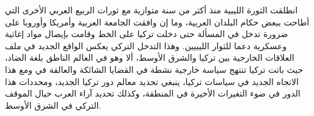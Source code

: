 \documentclass{article}
\begin{document}
\beginnumbering
\pstart[\setRL\arabicfont] %
انطلقت الثورة الليبية منذ أكثر من سنة
متوازية مع ثورات الربيع العربي الأخرى التي أطاحت ببعض حكام البلدان
العربية، وما إن وافقت الجامعة العربية وأمريكا وأوروبا على ضرورة تدخل
في المسألة حتى دخلت تركيا على الخط وقامت بإيصال مواد إغاثية وعسكرية
دعما للثوار الليبيين. وهذا التدخل التركي يعكس الواقع الجديد في ملف
العلاقات الخارجية بين تركيا والشرق الأوسط، ألا وهو  في العالم الناطق بلغة الضاد، حيث باتت تركيا تنتهج سياسة خارجية نشطة في القضايا الشائكة والعالقة في  ومع هذا الاتجاه الجديد في
سياسات تركيا، ينبغي تحديد معالم دور تركيا الجديد، ومحددات هذا الدور
في ضوء التغيرات الأخيرة في المنطقة، وكذلك تحديد آراء العرب حيال
الموقف التركي في الشرق الأوسط.
\pend
\endnumbering
\end{document}
